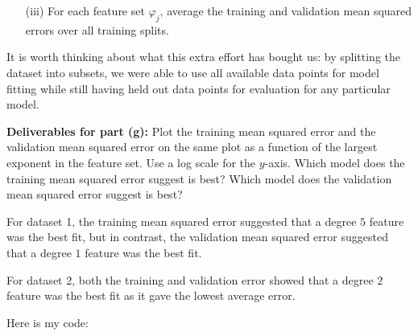 \documentclass{article}
\begin{document}
\begin{itemize}
\begin{itemize}
                    \item [(iii)] For each feature set $\varphi_{j}$, average the training and validation mean squared errors over all training splits.
                \end{itemize}
            It is worth thinking about what this extra effort has bought us: by splitting the dataset into subsets, we were able to use all available data points for model fitting while still having held out data points for evaluation for any particular model. 

            \textbf{Deliverables for part (g):} Plot the training mean squared error and the validation mean squared error on the same plot as a function of the largest exponent in the feature set. Use a log scale for the $y$-axis. Which model does the training mean squared error suggest is best? Which model does the validation mean squared error suggest is best?

        \end{itemize}
        \begin{answer}
            For dataset 1, the training mean squared error suggested that a degree $5$ feature was the best fit, but in contrast, the validation mean squared error suggested that a degree $1$ feature was the best fit. 

            For dataset 2, both the training and validation error showed that a degree $2$ feature was the best fit as it gave the lowest average error.

            Here is my code:
            \inputminted{python}{../code/q1.py}
        \end{answer}


    
\end{document}
